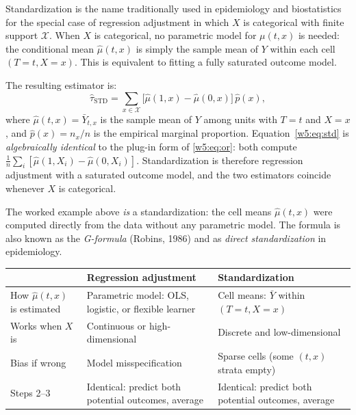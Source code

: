 \documentclass[master.tex]{subfiles}
\begin{document}
Standardization is the name traditionally used in epidemiology and
biostatistics for the special case of regression adjustment in which
$X$ is categorical with finite support $\mathcal{X}$.  When $X$ is
categorical, no parametric model for $\mu(t,x)$ is needed: the
conditional mean $\hat\mu(t,x)$ is simply the sample mean of $Y$
within each cell $(T{=}t, X{=}x)$.  This is equivalent to fitting a
fully saturated outcome model.

The resulting estimator is:
\begin{equation}
  \hat\tau_{\mathrm{STD}}
  = \sum_{x \in \mathcal{X}}
    \bigl[\hat\mu(1,x) - \hat\mu(0,x)\bigr]\,\hat{p}(x),
  \label{w5:eq:std}
\end{equation}
where $\hat\mu(t,x) = \bar{Y}_{t,x}$ is the sample mean of $Y$ among
units with $T{=}t$ and $X{=}x$, and $\hat{p}(x) = n_x/n$ is the
empirical marginal proportion.  Equation~\eqref{w5:eq:std} is
\emph{algebraically identical} to the plug-in form of
\eqref{w5:eq:or}: both compute $\frac{1}{n}\sum_i [\hat\mu(1,X_i) -
\hat\mu(0,X_i)]$.  Standardization is therefore regression adjustment
with a saturated outcome model, and the two estimators coincide
whenever $X$ is categorical.

The worked example above \emph{is} a standardization: the cell means
$\hat\mu(t,x)$ were computed directly from the data without any
parametric model.  The formula is also known as the \emph{G-formula}
(Robins, 1986) and as \emph{direct standardization} in epidemiology.

\begin{tcolorbox}[defstyle, title={Regression Adjustment vs.\ Standardization: Same Procedure, Different Estimator of $\hat\mu$}]
\renewcommand{\arraystretch}{1.4}
\begin{tabular}{p{3.5cm} p{4.5cm} p{4.5cm}}
\toprule
& \textbf{Regression adjustment}
& \textbf{Standardization} \\
\midrule
How $\hat\mu(t,x)$ is estimated
  & Parametric model: OLS, logistic, or flexible learner
  & Cell means: $\bar Y$ within $(T{=}t, X{=}x)$ \\
Works when $X$ is
  & Continuous or high-dimensional
  & Discrete and low-dimensional \\
Bias if wrong
  & Model misspecification
  & Sparse cells (some $(t,x)$ strata empty) \\
Steps 2--3
  & Identical: predict both potential outcomes, average
  & Identical: predict both potential outcomes, average \\
\bottomrule
\end{tabular}
\renewcommand{\arraystretch}{1}
\end{tcolorbox}
\end{document}
